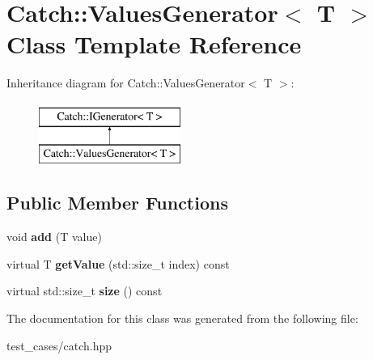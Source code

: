 \hypertarget{classCatch_1_1ValuesGenerator}{}\section{Catch\+:\+:Values\+Generator$<$ T $>$ Class Template Reference}
\label{classCatch_1_1ValuesGenerator}
Inheritance diagram for Catch\+:\+:Values\+Generator$<$ T $>$\+:\begin{figure}[H]
\begin{center}
\leavevmode
\includegraphics[height=2.000000cm]{classCatch_1_1ValuesGenerator}
\end{center}
\end{figure}
\subsection*{Public Member Functions}
\begin{DoxyCompactItemize}
\item 
\mbox{\label{classCatch_1_1ValuesGenerator_a8412c8ce5d9d4fc6ff06d5246d56d538}} 
void {\bfseries add} (T value)
\item 
\mbox{\label{classCatch_1_1ValuesGenerator_a9674c8b70d562d2d68154de92dd1810a}} 
virtual T {\bfseries get\+Value} (std\+::size\+\_\+t index) const
\item 
\mbox{\label{classCatch_1_1ValuesGenerator_a9aa5b140ee502975cf35115e534ab771}} 
virtual std\+::size\+\_\+t {\bfseries size} () const
\end{DoxyCompactItemize}


The documentation for this class was generated from the following file\+:\begin{DoxyCompactItemize}
\item 
test\+\_\+cases/catch.\+hpp\end{DoxyCompactItemize}
